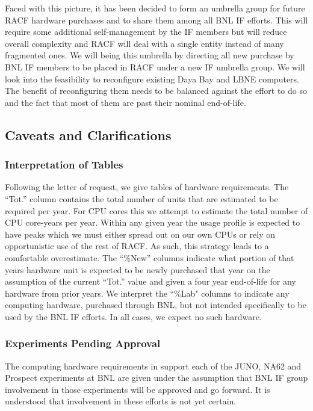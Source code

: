 \documentclass[pdftex,12pt,letter]{article}
\begin{document}
Faced with this picture, it has been decided to form an umbrella group
for future RACF hardware purchases and to share them among all BNL IF
efforts.
This will require some additional self-management by the IF members
but will reduce overall complexity and RACF will deal with a single
entity instead of many fragmented ones.
We will being this umbrella by directing all new purchase by BNL IF
members to be placed in RACF under a new IF umbrella group.
We will look into the feasibility to reconfigure existing Daya Bay and
LBNE computers.
The benefit of reconfiguring them needs to be balanced against the
effort to do so and the fact that most of them are past their nominal
end-of-life.

\subsection{Caveats and Clarifications}

\subsubsection{Interpretation of Tables}

Following the letter of request, we give tables of hardware
requirements.
The ``Tot.'' column contains the total number of units that are
estimated to be required per year.
For CPU cores this we attempt to estimate the total number of CPU
core-years per year.
Within any given year the usage profile is expected to have peaks
which we must either spread out on our own CPUs or rely on
opportunistic use of the rest of RACF.
As such, this strategy leads to a comfortable overestimate. 
The ``\%New'' columns indicate what portion of that years hardware
unit is expected to be newly purchased that year on the assumption of
the current ``Tot.'' value and given a four year end-of-life for any
hardware from prior years.
We interpret the ``\%Lab" columns to indicate any computing hardware,
purchased through BNL, but not intended specifically to be used by the
BNL IF efforts.
In all cases, we expect no such hardware.


\subsubsection{Experiments Pending Approval}

The computing hardware requirements in support each of the JUNO, NA62
and Prospect experiments at BNL are given under the assumption that
BNL IF group involvement in those experiments will be approved and go
forward.
It is understood that involvement in these efforts is not yet certain.
\end{document}
